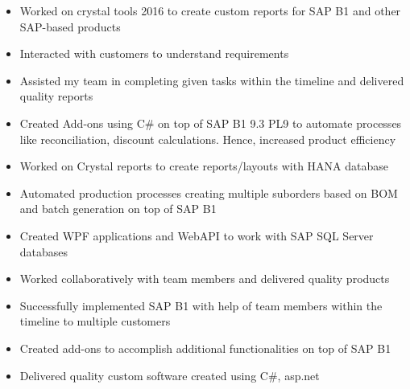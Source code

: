 \documentclass[10pt,a4paper,ragged2e,withhyper]{altacv}
\begin{document}
\begin{paracol}{2}


\begin{itemize}
\item Worked on crystal tools 2016 to create custom reports for SAP B1 and other SAP-based products
\item Interacted with customers to understand requirements
\item Assisted my team in completing given tasks within the timeline and delivered quality reports 
\end{itemize}

\divider

\begin{itemize}
\item Created Add-ons using C\# on top of SAP B1 9.3 PL9 to automate processes like reconciliation, discount calculations. Hence, increased product efficiency
\item Worked on Crystal reports to create reports/layouts with HANA database
\end{itemize}

\divider

\begin{itemize}
\item Automated production processes creating multiple suborders based on BOM and batch generation on top of SAP B1
\item Created WPF applications and WebAPI to work with SAP SQL Server databases
\item Worked collaboratively with team members and delivered quality products
\end{itemize}

\divider

\begin{itemize}
\item Successfully implemented SAP B1 with help of team members within the timeline to multiple customers
\item Created add-ons to accomplish additional functionalities on top of SAP B1
\item Delivered quality custom software created using C\#, asp.net
\end{itemize}


\end{paracol}
\end{document}
